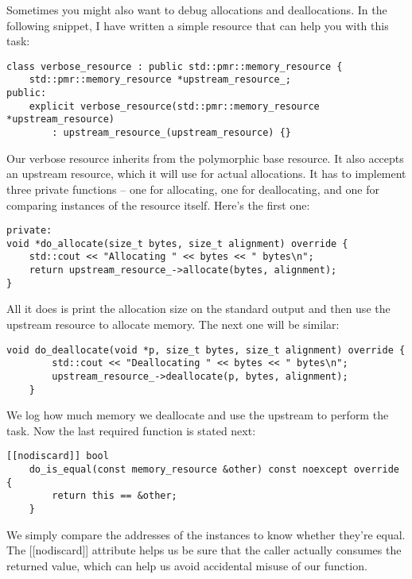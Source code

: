 Sometimes you might also want to debug allocations and deallocations. In the following snippet, I have written a simple resource that can help you with this task:

\begin{lstlisting}[style=styleCXX]
class verbose_resource : public std::pmr::memory_resource {
	std::pmr::memory_resource *upstream_resource_;
public:
	explicit verbose_resource(std::pmr::memory_resource *upstream_resource)
		: upstream_resource_(upstream_resource) {}
\end{lstlisting}

Our verbose resource inherits from the polymorphic base resource. It also accepts an upstream resource, which it will use for actual allocations. It has to implement three private functions – one for allocating, one for deallocating, and one for comparing instances of the resource itself. Here's the first one:

\begin{lstlisting}[style=styleCXX]
private:
void *do_allocate(size_t bytes, size_t alignment) override {
	std::cout << "Allocating " << bytes << " bytes\n";
	return upstream_resource_->allocate(bytes, alignment);
}
\end{lstlisting}

All it does is print the allocation size on the standard output and then use the upstream resource to allocate memory. The next one will be similar:

\begin{lstlisting}[style=styleCXX]
	void do_deallocate(void *p, size_t bytes, size_t alignment) override {
		std::cout << "Deallocating " << bytes << " bytes\n";
		upstream_resource_->deallocate(p, bytes, alignment);
	}
\end{lstlisting}

We log how much memory we deallocate and use the upstream to perform the task. Now the last required function is stated next:

\begin{lstlisting}[style=styleCXX]
	[[nodiscard]] bool
	do_is_equal(const memory_resource &other) const noexcept override {
		return this == &other;
	}
\end{lstlisting}

We simply compare the addresses of the instances to know whether they're equal. The [[nodiscard]] attribute helps us be sure that the caller actually consumes the returned value, which can help us avoid accidental misuse of our function.


